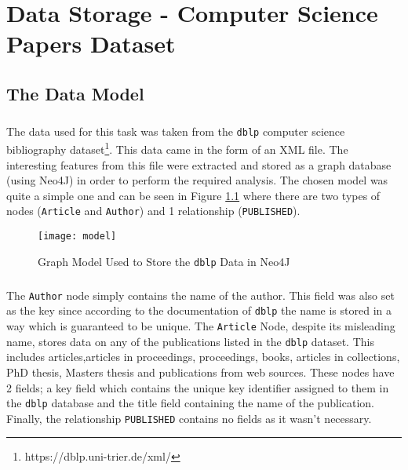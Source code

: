 \chapter{Data Storage - Computer Science Papers Dataset}

\section{The Data Model}
\paragraph{ }The data used for this task was taken from the \texttt{dblp} computer science bibliography dataset\footnote{https://dblp.uni-trier.de/xml/}. This data came in the form of an XML file. The interesting features from this file were extracted and stored as a graph database (using Neo4J) in order to perform the required analysis. The chosen model was quite a simple one and can be seen in Figure \ref{fig::model} where there are two types of nodes (\texttt{Article} and \texttt{Author}) and 1 relationship (\texttt{PUBLISHED}).

\begin{figure}[!b]
	\centering
	\texttt{[image: model]}
	\caption[Neo4J Model]{Graph Model Used to Store the \texttt{dblp} Data in Neo4J}
	\label{fig::model}
\end{figure}

\paragraph{ }The \texttt{Author} node simply contains the name of the author. This field was also set as the key since according to the documentation of \texttt{dblp} the name is stored in a way which is guaranteed to be unique. The \texttt{Article} Node, despite its misleading name, stores data on any of the publications listed in the \texttt{dblp} dataset. This includes articles,articles in proceedings, proceedings, books, articles in collections, PhD thesis, Masters thesis and publications from web sources. These nodes have 2 fields; a key field which contains the unique key identifier assigned to them in the \texttt{dblp} database and the title field containing the name of the publication. Finally, the relationship \texttt{PUBLISHED} contains no fields as it wasn't necessary.


